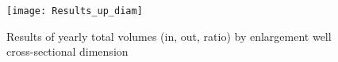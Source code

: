 
\begin{figure}[h!]
 \centering
 \texttt{[image: Results\_up\_diam]}
 \captionsetup{justification=centering} 
 \caption{Results of yearly total volumes (in, out, ratio) by enlargement well cross-sectional dimension}
 \label{fig:Results_up_diam}
\end{figure}

%
%
